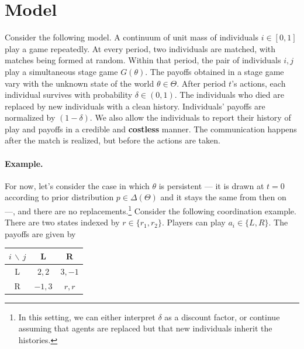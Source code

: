 \documentclass[12pt,letterpaper]{article}
\begin{document}
\doublespacing

\maketitle


\section{Model}

Consider the following model. A continuum of unit mass of individuals $i\in[0,1]$ play a game repeatedly. At every period, two individuals are matched, with matches being formed at random. Within that period, the pair of individuals $i,j$ play a simultaneous stage game $G(\theta)$. The payoffs obtained in a stage game vary with the unknown state of the world $\theta\in\Theta$. After period $t$'s actions, each individual survives with probability $\delta\in(0,1)$. The individuals who died are replaced by new individuals with a clean history. Individuals' payoffs are normalized by $(1-\delta)$. We also allow the individuals to report their history of play and payoffs in a credible and \textbf{costless} manner. The communication happens after the match is realized, but before the actions are taken.

\paragraph{Example.} For now, let's consider the case in which $\theta$ is persistent --- it is drawn at $t=0$ according to prior distribution $p\in \Delta(\Theta)$ and it stays the same from then on ---, and there are no replacements.\footnote{In this setting, we can either interpret $\delta$ as a discount factor, or continue assuming that agents are replaced but that new individuals inherit the histories.} Consider the following coordination example. There are two states indexed by $r\in\{r_1,r_2\}$. Players can play $a_i\in\{L,R\}$. The payoffs are given by 

\begin{table}[H]
    \centering
    \begin{tabular}{|c|c|c|}
        \hline
        $i\,\backslash \, j$  & L & R\\
        \hline
        L & $2,2$ & $3,-1$\\
        \hline
        R & $-1,3$ & $r,r$\\
        \hline
    \end{tabular}
\end{table}
\end{document}
